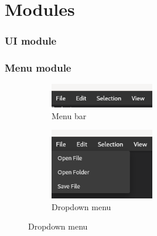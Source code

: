 \section{Modules}
\SectionPage

\begin{frame}
  \frametitle{UI module}
  \begin{figure}[H]
    \centering
    
  \end{figure}
\end{frame}

\begin{frame}
  \frametitle{Menu module}
  \begin{figure}[H]
    \begin{subfigure}[h]{0.45\textwidth}
    \centering
    \centering
    \includegraphics[width=0.5\textwidth]{./pics/menu-bar.png}
    \caption{
      Menu bar
    }
    \end{subfigure}
    \hfill
    \begin{subfigure}[h]{0.45\textwidth}
    \centering
    \centering
    \includegraphics[width=0.5\textwidth]{./pics/menu-dropdown.png}
    \caption{
      Dropdown menu
    }
    \end{subfigure}
  \end{figure}
\end{frame}

